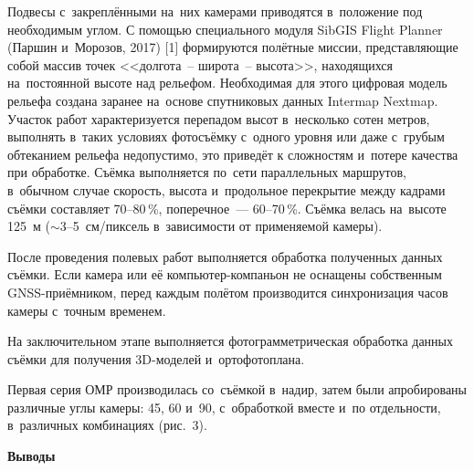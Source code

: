 Подвесы с~закреплёнными на~них камерами приводятся в~положение под необходимым углом.
\clearpage
С помощью специального модуля SibGIS Flight Planner (Паршин и~Морозов, 2017) [1] формируются полётные миссии, представляющие собой массив точек <<долгота~-- широта~-- высота>>, находящихся на~постоянной высоте над рельефом. Необходимая для этого цифровая модель рельефа создана заранее на~основе спутниковых данных Intermap Nextmap. Участок работ характеризуется перепадом высот в~несколько сотен метров, выполнять в~таких условиях фотосъёмку с~одного уровня или даже с~грубым обтеканием рельефа недопустимо, это приведёт к сложностям и~потере качества при обработке. Съёмка выполняется по~сети параллельных маршрутов, в~обычном случае скорость, высота и~продольное перекрытие между кадрами съёмки составляет 70--80\,\%, поперечное~--- 60--70\,\%. Съёмка велась на~высоте 125~м ($\sim$3--5~см/пиксель в~зависимости от применяемой камеры).

После проведения полевых работ выполняется обработка полученных данных съёмки. Если камера или её компьютер-компаньон не оснащены собственным GNSS-приёмником, перед каждым полётом производится синхронизация часов камеры с~точным временем.

На заключительном этапе выполняется фотограмметрическая обработка данных съёмки для получения 3D-моделей и~ортофотоплана.

Первая серия ОМР производилась со~съёмкой в~надир, затем были апробированы различные углы камеры: 45, 60 и~90\dg, с~обработкой вместе и~по отдельности, в~различных комбинациях (рис.~3).


\clearpage
\textbf{Выводы}

